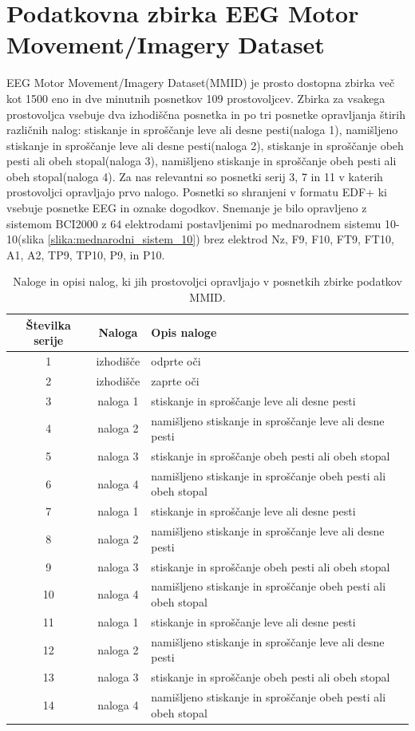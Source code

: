 \section{Podatkovna zbirka EEG Motor Movement/Imagery Dataset}
EEG Motor Movement/Imagery Dataset(MMID) je prosto dostopna zbirka več kot 1500 eno in dve minutnih posnetkov 109 prostovoljcev. Zbirka za vsakega prostovoljca vsebuje dva izhodiščna posnetka in po tri posnetke opravljanja štirih različnih nalog: stiskanje in sproščanje leve ali desne pesti(naloga 1), namišljeno stiskanje in sproščanje leve ali desne pesti(naloga 2), stiskanje in sproščanje obeh pesti ali obeh stopal(naloga 3), namišljeno stiskanje in sproščanje obeh pesti ali obeh stopal(naloga 4). Za nas relevantni so posnetki serij 3, 7 in 11 v katerih prostovoljci opravljajo prvo nalogo. Posnetki so shranjeni v formatu EDF+ ki vsebuje posnetke EEG in oznake dogodkov. Snemanje je bilo opravljeno z sistemom BCI2000 z 64 elektrodami postavljenimi po mednarodnem sistemu 10-10(slika \ref{slika:mednarodni_sistem_10}) brez elektrod Nz, F9, F10, FT9, FT10, A1, A2, TP9, TP10, P9, in P10.\cite{schalkBCI2000GeneralpurposeBraincomputer2004,schalkEEGMotorMovement2009}

\begin{table}[h]
\centering
\begin{tabular}{|c|c|l|}

\hline
Številka serije & Naloga &Opis naloge \\
\hline
1 & izhodišče & odprte oči  \\
\hline
2 & izhodišče & zaprte oči  \\
\hline
3 & naloga 1 & stiskanje in sproščanje leve ali desne pesti \\
\hline
4 & naloga 2 &namišljeno stiskanje in sproščanje leve ali desne pesti  \\
\hline
5 & naloga 3 &stiskanje in sproščanje obeh pesti ali obeh stopal \\
\hline
6 & naloga 4 &namišljeno stiskanje in sproščanje obeh pesti ali obeh stopal  \\
\hline
7 & naloga 1 &stiskanje in sproščanje leve ali desne pesti \\
\hline
8 & naloga 2 &namišljeno stiskanje in sproščanje leve ali desne pesti  \\
\hline
9 & naloga 3 &stiskanje in sproščanje obeh pesti ali obeh stopal \\
\hline
10 & naloga 4 &namišljeno stiskanje in sproščanje obeh pesti ali obeh stopal  \\
\hline
11 & naloga 1 &stiskanje in sproščanje leve ali desne pesti \\
\hline
12 &naloga 2 &namišljeno stiskanje in sproščanje leve ali desne pesti  \\
\hline
13 & naloga 3 &stiskanje in sproščanje obeh pesti ali obeh stopal \\
\hline
14 & naloga 4 &namišljeno stiskanje in sproščanje obeh pesti ali obeh stopal  \\

\hline
\end{tabular}
\caption{Naloge in opisi nalog, ki jih prostovoljci opravljajo v posnetkih zbirke podatkov MMID.}
\end{table}


